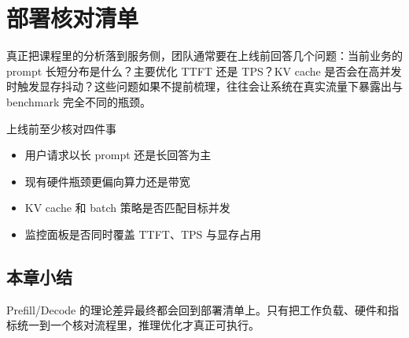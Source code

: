 \section{部署核对清单}
真正把课程里的分析落到服务侧，团队通常要在上线前回答几个问题：当前业务的 prompt 长短分布是什么？主要优化 TTFT 还是 TPS？KV cache 是否会在高并发时触发显存抖动？这些问题如果不提前梳理，往往会让系统在真实流量下暴露出与 benchmark 完全不同的瓶颈。

\begin{importantbox}{上线前至少核对四件事}
\begin{itemize}
  \item 用户请求以长 prompt 还是长回答为主
  \item 现有硬件瓶颈更偏向算力还是带宽
  \item KV cache 和 batch 策略是否匹配目标并发
  \item 监控面板是否同时覆盖 TTFT、TPS 与显存占用
\end{itemize}
\end{importantbox}

\subsection{本章小结}
Prefill/Decode 的理论差异最终都会回到部署清单上。只有把工作负载、硬件和指标统一到一个核对流程里，推理优化才真正可执行。

\newpage
